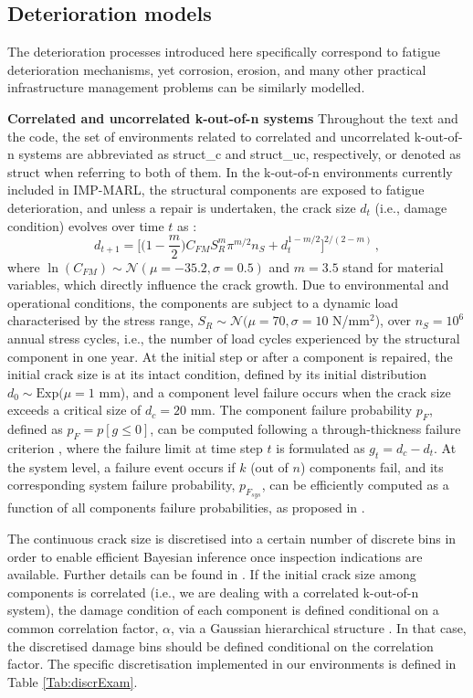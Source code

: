 \subsection{Deterioration models}
The deterioration processes introduced here specifically correspond to fatigue deterioration mechanisms, yet corrosion, erosion, and many other practical infrastructure management problems can be similarly modelled.

\textbf{Correlated and uncorrelated k-out-of-n systems}
Throughout the text and the code, the set of environments related to correlated and uncorrelated k-out-of-n systems are abbreviated as struct\_c and struct\_uc, respectively, or denoted as struct when referring to both of them. 
In the k-out-of-n environments currently included in IMP-MARL, the structural components are exposed to fatigue deterioration, and unless a repair is undertaken, the crack size $d_t$  (i.e., damage condition) evolves over time $t$ as \citep{Ditlevsen2007StructuralMethods}: 
\begin{equation} \label{Eq:ExamCrackGrow}
d_{t+1} =\bigg[ \Big(1-\frac{m}{2}\Big) C_{FM}S_{R}^m\pi ^{m/2}n_{S} + d_t^{1-m/2}\bigg] ^{2/(2-m)} \, ,
\end{equation}
where $\ln(C_{FM}) \sim \mathcal{N} (\mu=-35.2, \sigma=0.5)$ and $m=3.5$ stand for material variables, which directly influence the crack growth.
Due to environmental and operational conditions, the components are subject to a dynamic load characterised by the stress range, $S_{R}  \sim  \mathcal{N} (\mu=70, \sigma=10$ N/mm$^2$), over $n_{S}=10^6$ annual stress cycles, i.e., the number of load cycles experienced by the structural component in one year.
At the initial step or after a component is repaired, the initial crack size is at its intact condition, defined by its initial distribution $d_0  \sim  \text{Exp} (\mu=1$ mm), and a component level failure occurs when the crack size exceeds a critical size of $d_c=20$ mm. 
The component failure probability $p_{F}$, defined as $p_{F}=p[g \leq 0]$, can be computed following a through-thickness failure criterion \cite{hlaing2022inspection}, where the failure limit at time step $t$ is formulated as $g_{t}=d_c-d_t$. At the system level, a failure event occurs if $k$ (out of $n$) components fail, and its corresponding system failure probability, $p_{F_{sys}}$, can be efficiently computed as a function of all components failure probabilities, as proposed in \citep{barlow1984computing}. 

The continuous crack size is discretised into a certain number of discrete bins in order to enable efficient Bayesian inference once inspection indications are available.
Further details can be found in \citep{morato2022optimal}. 
If the initial crack size among components is correlated (i.e., we are dealing with a correlated k-out-of-n system), the damage condition of each component is defined conditional on a common correlation factor, $\alpha$, via a Gaussian hierarchical structure \citep{morato2022syst}.
In that case, the discretised damage bins should be defined conditional on the correlation factor.
The specific discretisation implemented in our environments is defined in Table \ref{Tab:discrExam}. 

